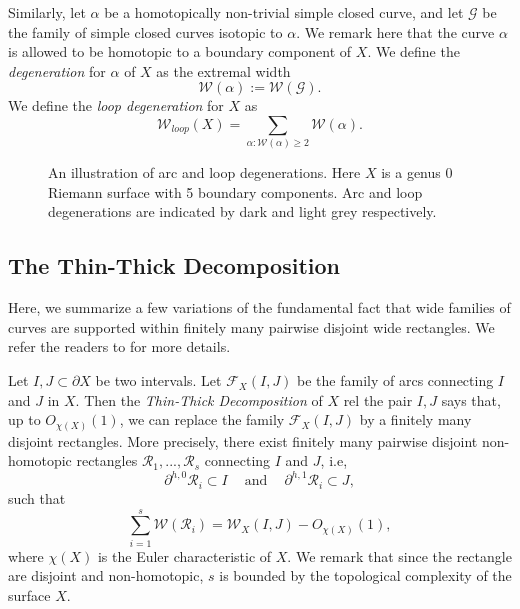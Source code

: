 \documentclass[11pt, reqno]{amsart}
\newcommand{\incfig}[1]{%
    \def\svgwidth{\columnwidth}
    {#1.pdf_tex}
}
\numberwithin{equation}{section}
\theoremstyle{plain}
\theoremstyle{theorem}
\theoremstyle{plain}
\theoremstyle{definition}
\numberwithin{figure}{section}
\renewcommand{\sp}{{\ \ }}
\newcommand{\Fam}{{\mathcal F}}
\newcommand{\Width}{{\mathcal W}}
\newcommand\RR{\mathcal{R}}
\begin{document}
Similarly, let $\alpha$ be a homotopically non-trivial simple closed curve, and let $\mathcal{G}$ be the family of simple closed curves isotopic to $\alpha$.
We remark here that the curve $\alpha$ is allowed to be homotopic to a boundary component of $X$.
We define the {\em degeneration} for $\alpha$ of $X$ as the extremal width 
$$
\mathcal{W}(\alpha) := \mathcal{W}(\mathcal{G}).
$$
We define the {\em loop degeneration} for $X$ as
$$
\mathcal{W}_{loop}(X) = \sum_{\alpha: \mathcal{W}(\alpha) \geq 2} \mathcal{W}(\alpha).
$$

\begin{figure}[ht]
  \centering
  \resizebox{0.8\linewidth}{!}{
  \incfig{TTD}
  }
  \caption{An illustration of arc and loop degenerations. Here $X$ is a genus $0$ Riemann surface with 5 boundary components. Arc and loop degenerations are indicated by dark and light grey respectively.}
  \label{fig:TTD}
\end{figure}

\subsection{The Thin-Thick Decomposition}
\label{ss:TTD}
Here, we summarize a few variations of the fundamental fact that wide families of curves are supported within finitely many pairwise disjoint wide rectangles. We refer the readers to \cite[\S7.6]{Lyu} for more details.

Let $I, J \subset \partial X$ be two intervals. Let $\Fam_X(I,J)$ be the family of arcs connecting $I$ and $J$ in $X$. Then the \emph{Thin-Thick Decomposition} of $X$ rel the pair $I,J$ says that, up to $O_{\chi(X)}(1)$, we can replace the family $\Fam_X(I,J)$ by a finitely many disjoint rectangles. More precisely, there exist finitely many pairwise disjoint non-homotopic rectangles $\RR_1,..., \RR_s$ connecting $I$ and $J$, i.e,
\[ \partial^{h,0} \RR_i \subset I \sp\sp\text{ and }\sp\sp  \partial^{h,1} \RR_i \subset J,\]
 such that 
\begin{equation}
\label{eq:TTD}    
 \sum_{i=1}^s \Width(\RR_i)=\Width_X(I,J)-O_{\chi(X)}(1),
\end{equation}
where $\chi(X)$ is the Euler characteristic of $X$.
We remark that since the rectangle are disjoint and non-homotopic, $s$ is bounded by the topological complexity of the surface $X$.
\end{document}
